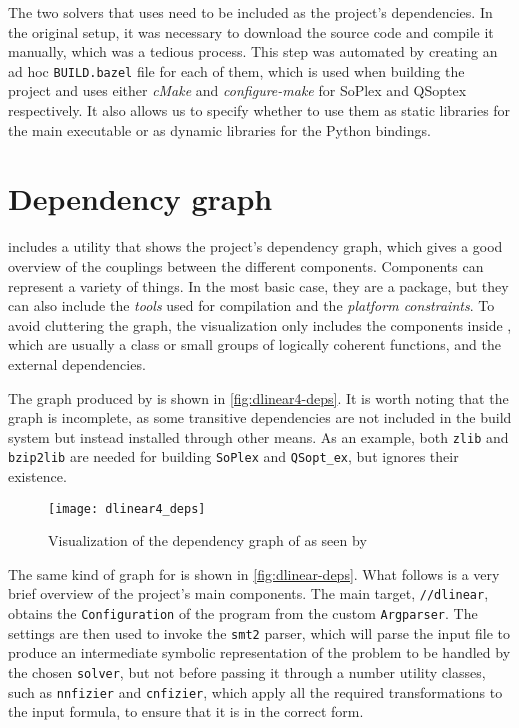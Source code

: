 The two solvers that \dlinear uses need to be included as the project's dependencies.
In the original setup, it was necessary to download the source code and compile it manually, which was a tedious process.
This step was automated by creating an ad hoc \texttt{BUILD.bazel} file for each of them, which is used when building the project and uses either \textit{cMake} and \textit{configure-make} for SoPlex and QSoptex respectively.
It also allows us to specify whether to use them as static libraries for the main executable or as dynamic libraries for the Python bindings.



\section{Dependency graph}
\label{sec:dependency_graph}

\bazel includes a utility that shows the project's dependency graph, which gives a good overview of the couplings between the different components.
Components can represent a variety of things.
In the most basic case, they are a \bazel package, but they can also include the \textit{tools} used for compilation and the \textit{platform constraints}.
To avoid cluttering the graph, the visualization only includes the components inside \dlinear, which are usually a class or small groups of logically coherent functions, and the external dependencies.

The graph produced by \dlinearfour is shown in \autoref{fig:dlinear4-deps}.
It is worth noting that the graph is incomplete, as some transitive dependencies are not included in the \bazel build system but instead installed through other means.
As an example, both \texttt{zlib} and \texttt{bzip2lib} are needed for building \texttt{SoPlex} and \texttt{QSopt\_ex}, but \bazel ignores their existence.

\begin{figure}[!h]
    \centering
    \texttt{[image: dlinear4\_deps]}
    \caption{Visualization of the dependency graph of \dlinearfour as seen by \bazel}\label{fig:dlinear4-deps}
\end{figure}

\clearpage

The same kind of graph for \dlinear is shown in \autoref{fig:dlinear-deps}.
What follows is a very brief overview of the project's main components.
The main target, \texttt{//dlinear}, obtains the \texttt{Configuration} of the program from the custom \texttt{Argparser}.
The settings are then used to invoke the \texttt{smt2} parser, which will parse the input file to produce an intermediate symbolic representation of the problem to be handled by the chosen \texttt{solver}, but not before passing it through a number utility classes, such as \texttt{nnfizier} and \texttt{cnfizier}, which apply all the required transformations to the input formula, to ensure that it is in the correct form.

